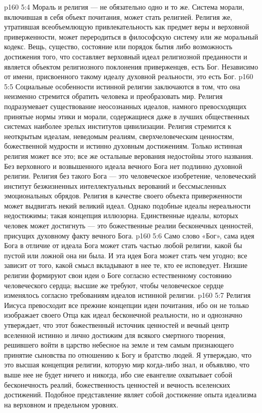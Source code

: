 \vs p160 5:4 Мораль и религия --- не обязательно одно и то же. Система морали, включившая в себя объект почитания, может стать религией. Религия же, утратившая всеобъемлющую привлекательность как предмет веры и верховной приверженности, может переродиться в философскую систему или же моральный кодекс. Вещь, существо, состояние или порядок бытия либо возможность достижения того, что составляет верховный идеал религиозной преданности и является объектом религиозного поклонения приверженцев, есть Бог. Независимо от имени, присвоенного такому идеалу духовной реальности, это есть Бог.
\vs p160 5:5 Социальные особенности истинной религии заключаются в том, что она неизменно стремится обратить человека и преобразовать мир. Религия подразумевает существование неосознанных идеалов, намного превосходящих принятые нормы этики и морали, содержащиеся даже в лучших общественных системах наиболее зрелых институтов цивилизации. Религия стремится к неоткрытым идеалам, неведомым реалиям, сверхчеловеческим ценностям, божественной мудрости и истинно духовным достижениям. Только истинная религия может все это; все же остальные верования недостойны этого названия. Без верховного и возвышенного идеала вечного Бога нет подлинно духовной религии. Религия без такого Бога --- это человеческое изобретение, человеческий институт безжизненных интеллектуальных верований и бессмысленных эмоциональных обрядов. Религия в качестве своего объекта приверженности может выдвигать некий великий идеал. Однако подобные идеалы нереальности недостижимы; такая концепция иллюзорна. Единственные идеалы, которых человек может достигнуть --- это божественные реалии бесконечных ценностей, присущих духовному факту вечного Бога.
\vs p160 5:6 Само слово «Бог», сама идея Бога в отличие от идеала Бога может стать частью любой религии, какой бы пустой или ложной она ни была. И эта идея Бога может стать чем угодно; все зависит от того, какой смысл вкладывают в нее те, кто ее исповедует. Низшие религии формируют свои идеи о Боге согласно естественному состоянию человеческого сердца; высшие же требуют, чтобы человеческое сердце изменялось согласно требованиям идеалов истинной религии.
\vs p160 5:7 \pc Религия Иисуса превосходит все прежние концепции идеи почитания, ибо он не только изображает своего Отца как идеал бесконечной реальности, но и однозначно утверждает, что этот божественный источник ценностей и вечный центр вселенной истинно и лично достижим для всякого смертного творения, решившего войти в царство небесное на земле и тем самым признающего принятие сыновства по отношению к Богу и братство людей. Я утверждаю, что это высшая концепция религии, которую мир когда\hyp{}либо знал, и объявляю, что выше нее не будет ничего и никогда, ибо сие евангелие охватывает собой бесконечность реалий, божественность ценностей и вечность вселенских достижений. Подобное представление являет собой достижение опыта идеализма на верховном и предельном уровнях.
